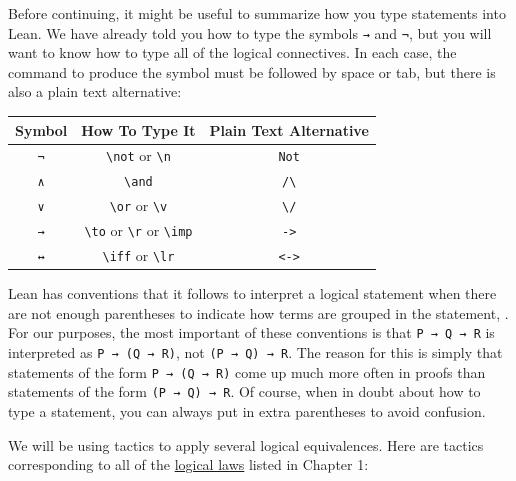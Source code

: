 \documentclass[
  letterpaper,
  DIV=11,
  numbers=noendperiod]{scrreprt}
\newcommand{\excl}[1]{}
\begin{document}
Before continuing, it might be useful to summarize how you type
statements into Lean. We have already told you how to type the symbols
\texttt{→} and \texttt{¬}, but you will want to know how to type all of
the logical connectives. In each case, the command to produce the symbol
must be followed by space or tab, but there is also a plain text
alternative:

\begin{longtable}[]{@{}ccc@{}}
\toprule()
Symbol & How To Type It & Plain Text Alternative \\
\midrule()
\endhead
\texttt{¬} & \texttt{\textbackslash{}not} or \texttt{\textbackslash{}n}
& \texttt{Not} \\
\texttt{∧} & \texttt{\textbackslash{}and} &
\texttt{/\textbackslash{}} \\
\texttt{∨} & \texttt{\textbackslash{}or} or \texttt{\textbackslash{}v} &
\texttt{\textbackslash{}/} \\
\texttt{→} & \texttt{\textbackslash{}to} or \texttt{\textbackslash{}r}
or \texttt{\textbackslash{}imp} &
\excl{\texttt{-\textgreater{}}}\texttt{-\null>} \\
\texttt{↔} & \texttt{\textbackslash{}iff} or \texttt{\textbackslash{}lr}
& \excl{\texttt{\textless{}-\textgreater{}}}\texttt{<-\null>} \\
\bottomrule()
\end{longtable}

Lean has conventions that it follows to interpret a logical statement
when there are not enough parentheses to indicate how terms are grouped
in the statement, . For our purposes, the most important of these
conventions is that \texttt{P\ →\ Q\ →\ R} is interpreted as
\texttt{P\ →\ (Q\ →\ R)}, not \texttt{(P\ →\ Q)\ →\ R}. The reason for
this is simply that statements of the form \texttt{P\ →\ (Q\ →\ R)} come
up much more often in proofs than statements of the form
\texttt{(P\ →\ Q)\ →\ R}. Of course, when in doubt about how to type a
statement, you can always put in extra parentheses to avoid confusion.

We will be using tactics to apply several logical equivalences. Here are
tactics corresponding to all of the
\protect\hyperlink{prop-laws}{logical laws} listed in Chapter 1:
\end{document}
